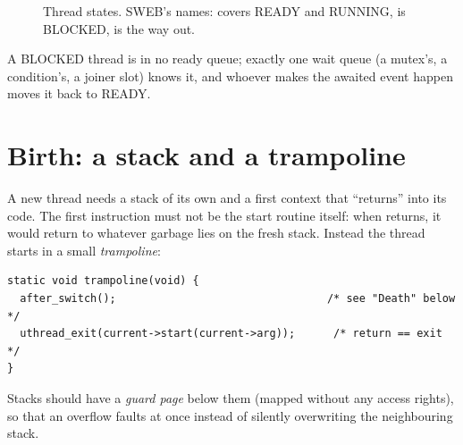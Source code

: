 \begin{figure}[htbp]
\centering
{}
\caption{Thread states. SWEB's names:  covers READY and
RUNNING,  is BLOCKED,  is the way out.}
\label{fig:states}
\end{figure}

A BLOCKED thread is in no ready queue; exactly one wait queue (a mutex's,
a condition's, a joiner slot) knows it, and whoever makes the awaited
event happen moves it back to READY.

\section{Birth: a stack and a trampoline}

A new thread needs a stack of its own and a first context that ``returns''
into its code. The first instruction must not be the start routine itself:
when  returns, it would return to whatever garbage
lies on the fresh stack. Instead the thread starts in a small
\emph{trampoline}:

\begin{lstlisting}
static void trampoline(void) {
  after_switch();                                 /* see "Death" below */
  uthread_exit(current->start(current->arg));      /* return == exit */
}
\end{lstlisting}

Stacks should have a \emph{guard page} below them (mapped without any
access rights), so that an overflow faults at once instead of silently
overwriting the neighbouring stack.


